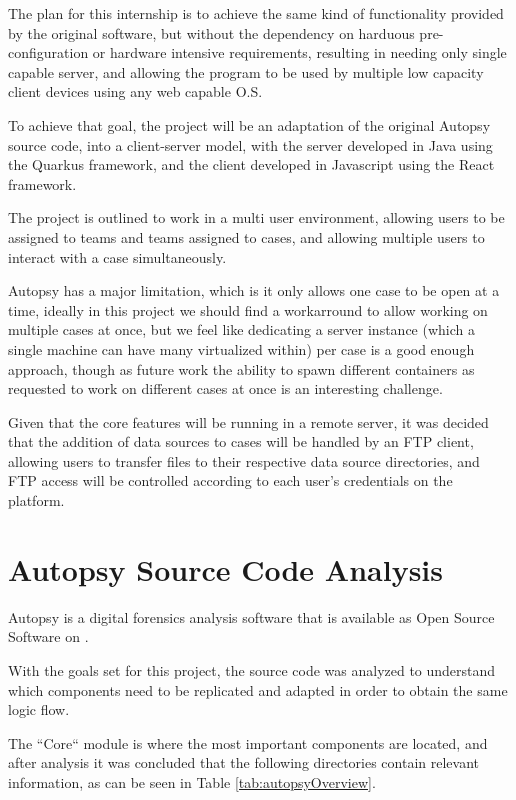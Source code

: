 The plan for this internship is to achieve the same kind of functionality provided by the original software, but without the dependency on harduous pre-configuration
or hardware intensive requirements, resulting in needing only single capable server, and allowing the program to be used by multiple low capacity client devices using 
any web capable O.S.

To achieve that goal, the project will be an adaptation of the original Autopsy source code, into a client-server model, with the server developed in Java using the Quarkus \cite{quarkus} framework,
and the client developed in Javascript using the React \cite{react} framework.

The project is outlined to work in a multi user environment, allowing users to be assigned to teams and teams assigned to cases, and allowing multiple users to interact with
a case simultaneously.

Autopsy has a major limitation, which is it only allows one case to be open at a time, ideally in this project we should find a workarround to allow working on multiple cases
at once, but we feel like dedicating a server instance (which a single machine can have many virtualized within) per case is a good enough approach, though as future work the
ability to spawn different containers as requested to work on different cases at once is an interesting challenge.

Given that the core features will be running in a remote server, it was decided that the addition of data sources to cases will be handled by an FTP client, allowing users
to transfer files to their respective data source directories, and FTP access will be controlled according to each user's credentials on the platform.

\section{Autopsy Source Code Analysis}

Autopsy is a digital forensics analysis software that is available as Open Source Software \cite{opensource} on  \cite{github}.

With the goals set for this project, the source code was analyzed to understand which components need to be replicated and adapted in order to obtain the same logic flow.

The ``Core`` module is where the most important components are located, and after analysis it was concluded that the following directories contain relevant information, as can be seen in Table \ref{tab:autopsyOverview}.

